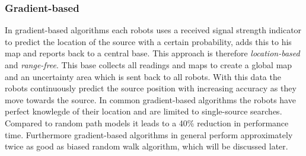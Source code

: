 	\subsubsection{Gradient-based}
		In gradient-based algorithms each robots uses a received signal strength indicator to predict the location of the source with a certain probability, adds this to his map and reports back to a central base.
		This approach is therefore \emph{location-based} and \emph{range-free}.
		This base collects all readings and maps to create a global map and an uncertainty area which is sent back to all robots.
		With this data the robots continuously predict the source position with increasing accuracy as they move towards the source. 
		In common gradient-based algorithms the robots have perfect knowlegde of their location and are limited to single-source searches.
		Compared to random path models it leads to a 40\% reduction in performance time. \cite{zhang2009gradient}
		Furthermore gradient-based algorithms in general perform approximately twice as good as biased random walk algorithm, which will be discussed later. \cite{zhang2009gradient}


